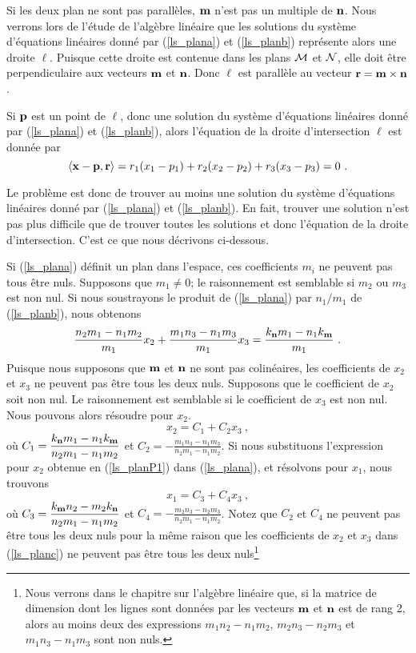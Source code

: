 {Si les deux plan ne sont pas parallèles, $\mathbf{m}$ n'est pas un multiple de
$\mathbf{n}$.  Nous verrons lors de l'étude de l'algèbre linéaire que les
solutions du système d'équations linéaires donné par (\ref{ls_plana}) et
(\ref{ls_planb}) représente alors une droite $\ell$.  Puisque cette droite
est contenue dans les plans $\cal M$ et $\cal N$, elle doit être
perpendiculaire aux vecteurs $\mathbf{m}$ et $\mathbf{n}$.  Donc $\ell$ est
parallèle au vecteur $\mathbf{r} = \mathbf{m} \times \mathbf{n}$.

Si $\mathbf{p}$ est un point de $\ell$, donc une solution du système
d'équations linéaires donné par (\ref{ls_plana}) et (\ref{ls_planb}),
alors l'équation de la droite d'intersection $\ell$ est donnée par
\[
  \left\langle{\mathbf{x} - \mathbf{p}} , {\mathbf{r}}\right\rangle =  r_1(x_1 - p_1) + r_2(x_2-p_2) +
  r_3(x_3 - p_3) = 0 \ .
\]

Le problème est donc de trouver au moins une solution du système
d'équations linéaires donné par (\ref{ls_plana}) et (\ref{ls_planb}).
En fait, trouver une solution n'est pas plus difficile que de trouver
toutes les solutions et donc l'équation de la droite d'intersection.
C'est ce que nous décrivons ci-dessous.

Si (\ref{ls_plana}) définit un plan dans l'espace, ces coefficients
$m_i$ ne peuvent pas tous être nuls.  Supposons que $m_1 \neq 0$; 
le raisonnement est semblable si $m_2$ ou $m_3$ est non nul.  Si nous
soustrayons le produit de (\ref{ls_plana}) par $n_1/m_1$ de
(\ref{ls_planb}), nous obtenons
\begin{equation}\label{ls_planc}
  \frac{n_2 m_1 - n_1 m_2}{m_1} x_2 + \frac{m_1 n_3 - n_1 m_3}{m_1} x_3 =
  \frac{k_{\mathbf{n}} m_1 - n_1 k_{\mathbf{m}}}{m_1} \ .
\end{equation}
Puisque nous supposons que $\mathbf{m}$ et $\mathbf{n}$ ne sont pas
colinéaires, les coefficients de $x_2$ et $x_3$ ne peuvent pas être tous
les deux nuls.  Supposons que le coefficient de $x_2$ soit non nul.  Le
raisonnement est semblable si le coefficient de $x_3$ est non nul.  Nous
pouvons alors résoudre pour $x_2$. 
\begin{equation}\label{ls_planP1}
  x_2 = C_1 + C_2 x_3 \ ,
\end{equation}
où
$\displaystyle  C_1 = \frac{k_{\mathbf{n}} m_1 - n_1 k_{\mathbf{m}}}{n_2 m_1 - n_1 m_2}$ et
$\displaystyle  C_2 = - \frac{m_1 n_3 - n_1 m_3}{n_2 m_1 - n_1 m_2}$.
Si nous substituons l'expression pour $x_2$ obtenue en (\ref{ls_planP1})
dans (\ref{ls_plana}), et résolvons pour $x_1$, nous trouvons
\begin{equation}\label{ls_planP2}
  x_1 = C_3 + C_4 x_3 \ ,
\end{equation}
où
$\displaystyle  C_3 =
\frac{k_{\mathbf{m}} n_2 - m_2 k_{\mathbf{n}}}{n_2 m_1 - n_1 m_2}$ et
$\displaystyle  C_4 = - \frac{m_2 n_3 - n_2 m_3}{n_2 m_1 - n_1 m_2}$.
Notez que $C_2$ et $C_4$ ne peuvent pas être tous les deux nuls pour
la même raison que les coefficients de $x_2$ et $x_3$ dans
(\ref{ls_planc}) ne peuvent pas être tous les deux nuls\footnote{Nous
verrons dans le chapitre sur l'algèbre linéaire que, si la matrice de
dimension  dont les lignes sont données par les vecteurs
$\mathbf{m}$ et $\mathbf{n}$ est de rang 2, alors au moins deux des
expressions $m_1 n_2 - n_1 m_2$, $m_2 n_3 - n_2 m_3$ et
$m_1 n_3 - n_1 m_3$ sont non nuls.}

}
